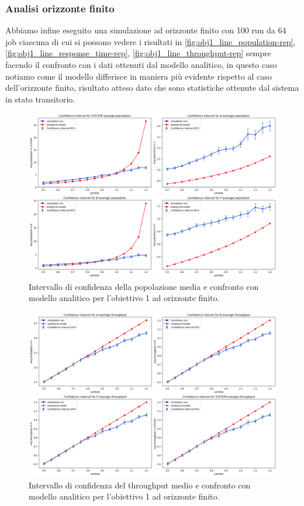 \subsubsection{Analisi orizzonte finito}
\label{sec:results-obj1-transient}
Abbiamo infine eseguito una simulazione ad orizzonte finito con 100 run da 64 job ciascuna di cui si possono vedere i risultati in \autoref{fig:obj1_line_population-rep}, \autoref{fig:obj1_line_response_time-rep}, \autoref{fig:obj1_line_throughput-rep} sempre facendo il confronto con i dati ottenuti dal modello analitico, in questo caso notiamo come il modello differisce in maniera più evidente rispetto al caso dell'orizzonte finito, risultato atteso dato che sono statistiche ottenute dal sistema in stato transitorio.
\begin{figure}
    \centering
    \includegraphics[width=\textwidth]{figs//results/obj1/obj1-line-population-rep.png}
    \caption{Intervallo di confidenza della popolazione media e confronto con modello analitico per l'obiettivo 1 ad orizzonte finito.}
    \label{fig:obj1_line_population-rep}
\end{figure}
\begin{figure}
    \centering
    \includegraphics[width=\textwidth]{figs//results/obj1/obj1-line-throughput-rep.png}
    \caption{Intervallo di confidenza del throughput medio e confronto con modello analitico per l'obiettivo 1 ad orizzonte finito.}
    \label{fig:obj1_line_throughput-rep}
\end{figure}
